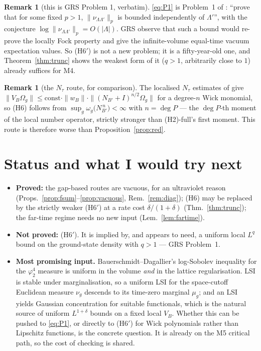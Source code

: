 \documentclass[11pt,a4paper]{article}
\theoremstyle{plain}
\theoremstyle{definition}
\newtheorem{remark}[theorem]{Remark}
\newcommand{\Om}{\Omega}
\begin{document}
\begin{remark}[this is GRS Problem 1, verbatim]
\eqref{eq:P1} is Problem~1 of \cite[p.~125]{GRS75}: ``prove that for some fixed $p>1$,
$\|\nu_{\Lambda\Lambda'}\|_p$ is bounded independently of $\Lambda'$'', with the conjecture
$\log\|\nu_{\Lambda\Lambda'}\|_p=O(|\Lambda|)$. GRS observe that such a bound would re-prove the
locally Fock property and give the infinite-volume equal-time vacuum expectation values. So
(H6$'$) is not a new problem; it is a fifty-year-old one, and Theorem~\ref{thm:trunc} shows the
weakest form of it ($q>1$, arbitrarily close to $1$) already suffices for M4.
\end{remark}

\begin{remark}[the $N_\tau$ route, for comparison]
The localised $N_\tau$ estimates of \cite[(3.2.9), (4.19)]{GJIII} give
$\|V_B\Om_g\|\le\text{const}\cdot\|w_B\|\cdot\|(N_{B'}+I)^{n/2}\Om_g\|$ for a degree-$n$ Wick
monomial, so (H6) follows from $\sup_g\omega_g\bigl(N_{B'}^{\,n}\bigr)<\infty$ with
$n=\deg P$ --- the $\deg P$-th moment of the local number operator, strictly stronger than
(H2)-full's first moment. This route is therefore worse than Proposition~\ref{prop:red}.
\end{remark}

\section{Status and what I would try next}

\begin{itemize}
\item \textbf{Proved:} the gap-based routes are vacuous, for an ultraviolet reason
      (Props.~\ref{prop:fsum}--\ref{prop:vacuous}, Rem.~\ref{rem:diag}); (H6) may be replaced by
      the strictly weaker (H6$'$) at a rate cost $\delta/(1+\delta)$ (Thm.~\ref{thm:trunc}); the
      far-time regime needs no new input (Lem.~\ref{lem:fartime}).
\item \textbf{Not proved:} (H6$'$). It is implied by, and appears to need, a uniform local $L^q$
      bound on the ground-state density with $q>1$ --- GRS Problem~1.
\item \textbf{Most promising input.} Bauerschmidt--Dagallier's log-Sobolev inequality for the
      $\varphi^4_2$ measure is uniform in the volume \emph{and} in the lattice regularisation.
      LSI is stable under marginalisation, so a uniform LSI for the space-cutoff Euclidean measure
      $\nu_g$ descends to its time-zero marginal $\mu_g$; and an LSI yields Gaussian concentration
      for suitable functionals, which is the natural source of uniform $L^{1+\delta}$ bounds on a
      fixed local $V_B$. Whether this can be pushed to \eqref{eq:P1}, or directly to (H6$'$) for
      Wick polynomials rather than Lipschitz functions, is the concrete question. It is already on
      the M5 critical path, so the cost of checking is shared.
\end{itemize}
\end{document}
